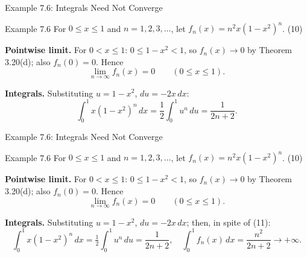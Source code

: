 \documentclass[aspectratio=169,12pt,t]{beamer}
\begin{document}
{%
\begin{frame}{Example 7.6: Integrals Need Not Converge}
  \begin{exblock}{Example 7.6}
    For $0 \leq x \leq 1$ and $n = 1, 2, 3, \dots$, let \quad
    $f_n(x) = n^2 x (1 - x^2)^n$. \hfill (10)
  \end{exblock}
  \begin{hlbox}

  \textbf{Pointwise limit.} For $0 < x \leq 1$: $0 \leq 1 - x^2 < 1$, so
  $f_n(x) \to 0$ by Theorem 3.20(d); also $f_n(0) = 0$. Hence
  \begin{equation}
    \lim_{n \to \infty} f_n(x) = 0 \qquad (0 \leq x \leq 1). \tag{11}
  \end{equation}

  \textbf{Integrals.} Substituting $u = 1 - x^2$, $du = -2x\,dx$:
  \[
    \int_0^1 x (1 - x^2)^n\,dx = \frac{1}{2}\int_0^1 u^n\,du = \frac{1}{2n + 2}.
  \]
  \end{hlbox}

\end{frame}

\begin{frame}{Example 7.6: Integrals Need Not Converge}
  \begin{exblock}{Example 7.6}
    For $0 \leq x \leq 1$ and $n = 1, 2, 3, \dots$, let \quad
    $f_n(x) = n^2 x (1 - x^2)^n$. \hfill (10)
  \end{exblock}
  \begin{hlbox}

  \textbf{Pointwise limit.} For $0 < x \leq 1$: $0 \leq 1 - x^2 < 1$, so
  $f_n(x) \to 0$ by Theorem 3.20(d); also $f_n(0) = 0$. Hence
  \begin{equation}
    \lim_{n \to \infty} f_n(x) = 0 \qquad (0 \leq x \leq 1). \tag{11}
  \end{equation}

  \textbf{Integrals.} Substituting $u = 1 - x^2$, $du = -2x\,dx$; then, in spite of (11):
  \[
    \int_0^1 x (1 - x^2)^n\,dx = \tfrac{1}{2}\int_0^1 u^n\,du = \frac{1}{2n + 2},
    \quad
    \boxed{\int_0^1 f_n(x)\,dx = \frac{n^2}{2n + 2} \to +\infty.}
  \]
  \end{hlbox}


\end{frame}}
\end{document}
